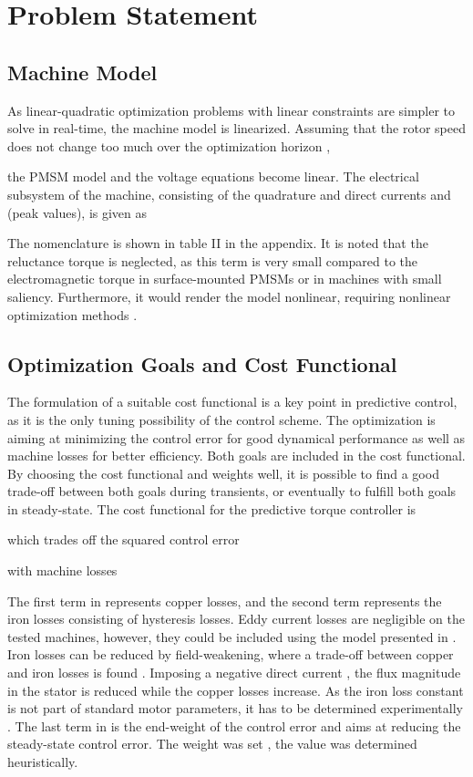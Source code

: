 \documentclass[a4paper,11pt,fleqn]{article}
\begin{document}
\section*{Problem Statement}


\subsection*{Machine Model}

As linear-quadratic optimization problems with linear constraints are simpler to solve in real-time, the machine model is linearized. Assuming that the rotor speed does not change too much over the optimization horizon ,

the PMSM model and the voltage equations become linear. The electrical subsystem of the machine, consisting of the quadrature and direct currents  and  (peak values), is given as

The nomenclature is shown in table II in the appendix. It is noted that the reluctance torque  is neglected, as this term is very small compared to the electromagnetic torque in surface-mounted PMSMs or in machines with small saliency. Furthermore, it would render the model nonlinear, requiring nonlinear optimization methods \cite{Delaleau}.




\subsection*{Optimization Goals and Cost Functional}

The formulation of a suitable cost functional is a key point in predictive control, as it is the only tuning possibility of the control scheme. The optimization is aiming at minimizing the control error for good dynamical performance as well as machine losses for better efficiency. Both goals are included in the cost functional. By choosing the cost functional and weights well, it is possible to find a good trade-off between both goals during transients, or eventually to fulfill both goals in steady-state. The cost functional for the predictive torque controller is

which trades off the squared control error

with machine losses 

The first term in  represents copper losses, and the second term represents the iron losses consisting of hysteresis losses. Eddy current losses are negligible on the tested machines, however, they could be included using the model presented in \cite{Eisenmodell}. Iron losses can be reduced by field-weakening, where a trade-off between copper and iron losses is found \cite{PMSMeff}. Imposing a negative direct current , the flux magnitude in the stator is reduced while the copper losses increase. As the iron loss constant  is not part of standard motor parameters, it has to be determined experimentally \cite{Eisenverlust}. The last term in  is the end-weight of the control error and aims at reducing the steady-state control error. The weight  was set , the value was determined heuristically.
\end{document}
